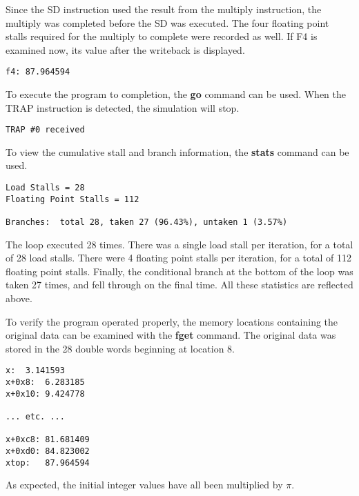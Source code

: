 Since the SD instruction used the result from the multiply instruction,
the multiply was completed before the SD was executed.  The four floating
point stalls required for the multiply to complete were recorded as well.
If F4 is examined now, its value after the writeback is displayed. \\

\begin{verbatim}
f4:	87.964594
\end{verbatim}

To execute the program to completion, the {\bf go} command can be used.
When the TRAP instruction is detected, the simulation will stop. \\

\begin{verbatim}
TRAP #0 received
\end{verbatim}

To view the cumulative stall and branch information, the {\bf stats} command
can be used. \\

\begin{verbatim}
Load Stalls = 28
Floating Point Stalls = 112

Branches:  total 28, taken 27 (96.43%), untaken 1 (3.57%)
\end{verbatim}

The loop executed 28 times.  There was a single load stall per iteration, 
for a total of 28 load stalls.  There were 4 floating point stalls per
iteration, for a total of 112 floating point stalls.  Finally, the
conditional branch at the bottom of the loop was taken 27 times, and
fell through on the final time.  All these statistics are reflected above.

To verify the program operated properly, the memory locations containing
the original data can be examined with the {\bf fget} command.  The original
data was stored in the 28 double words beginning at location 8.\\

\begin{verbatim}
x:	3.141593
x+0x8:	6.283185
x+0x10:	9.424778

... etc. ...

x+0xc8:	81.681409
x+0xd0:	84.823002
xtop:	87.964594
\end{verbatim}

As expected, the initial integer values have all been multiplied by $\pi$.

